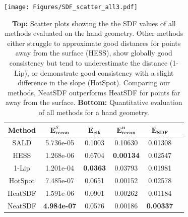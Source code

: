 \documentclass[12pt,openany]{book}
\theoremstyle{plainnormal}
\theoremstyle{remark}
\begin{document}
\begin{table}
\hspace*{-0.3cm}
\texttt{[image: Figures/SDF\_scatter\_all3.pdf]}
\vspace*{0.5cm}  %
    \par  %
        \begin{tabular}{cccccc}
        \toprule
        \textbf{Method} &$\mathbf{E_{recon}^{\mathcal{S}}}$ & $\mathbf{E_{eik}}$ &$\mathbf{E_{recon}^n}$ & $\mathbf{E_{SDF}}$\\ 
        \midrule
        SALD & 5.736e-05 &  0.1003 & 0.10630 & 0.01308\\ %
        HESS & 1.268e-06  &  0.6704 &\textbf{0.00134} &0.02547   \\ 
        1-Lip   & 1.201e-04   & \textbf{0.0363} &0.03793&0.01981\\  %
        HotSpot  &7.485e-07 &   0.0651 & 0.00152 &  0.02578\\  %
        \midrule
        HeatSDF & 1.591e-06  & 0.0901 &  0.00262&0.01184\\  %
        
        NeatSDF & \textbf{4.984e-07} & 0.0576 & 0.00186 & \textbf{0.00337} \\%
        \bottomrule
    \end{tabular}
    \caption{\textbf{Top:} Scatter plots showing the the SDF values of all methods evaluated on the hand geometry. Other methods either struggle to approximate good distances for points away from the surface (HESS), show globally good consistency but tend to underestimate the distance (1-Lip), or demonstrate good consistency with a slight difference in the slope (HotSpot). Comparing our methods, NeatSDF outperforms HeatSDF for points far away from the surface. \textbf{Bottom:} Quantitative evaluation of all methods for a hand geometry.}
    \label{tab:handquant}
\end{table}
        
\end{document}
